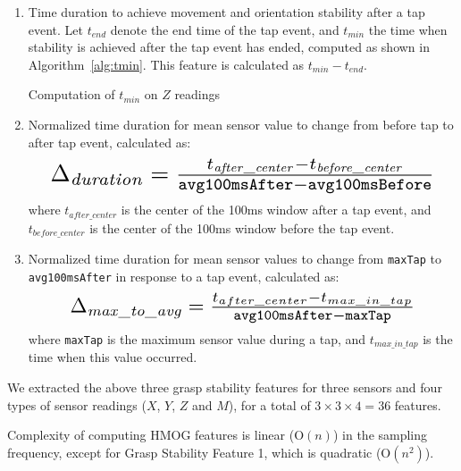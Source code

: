 \begin{enumerate}
\item Time duration to achieve movement and orientation stability after a 
tap event. Let $t_{end}$ denote the end time of the tap event, and $t_{min}$ the 
time when stability is achieved after the tap event has ended, computed as shown in Algorithm~\ref{alg:tmin}. This feature is 
calculated as $t_{min} - t_{end}$.
\begin{algorithm}[h!]
\footnotesize
\caption{Computation of $t_{min}$ on $Z$ readings}
%
\begin{algorithmic}[1]
\ENDFOR
{}
\end{algorithmic}
\label{alg:tmin}
\end{algorithm}

\item {Normalized time duration for mean sensor value to change from before tap to after tap event}, calculated as:
\[\resizebox{0.89\linewidth}{!}{$
\Delta_{\mathit{duration}} = \frac{t_{\mathit{after\_center}} - t_{\mathit{before\_center}}}{\texttt{avg100msAfter} - \texttt{avg100msBefore}}
$}
\]
where $t_{\mathit{after\_center}}$ is the center of the 100ms window after a tap event, and $t_{\mathit{before\_center}}$ is the center of the 100ms window before the tap event. 




\item Normalized time duration for mean sensor values to change from \texttt{maxTap} to \texttt{avg100msAfter} in response to a tap event, calculated as:
\[\resizebox{0.8\linewidth}{!}{$
\Delta_{\mathit{max\_to\_avg}} = \frac{t_{after\_center} - t_{{max\_in\_tap}}}{\texttt{avg100msAfter} -\texttt{maxTap}}
$}
\]
where \texttt{maxTap} is the maximum sensor value during a tap, and $t_{{max\_in\_tap}}$ is the time when this value occurred.
\end{enumerate}
We extracted the above three grasp stability features for three sensors and four types of sensor readings ($X$, $Y$, $Z$ and $M$), for a total of $3 \times 3 \times 4 = 36$ features. 

\medskip
Complexity of computing HMOG features is linear (O$(n)$) in the sampling frequency, except for Grasp Stability Feature 1, which is quadratic (O$(n^2)$).

%


